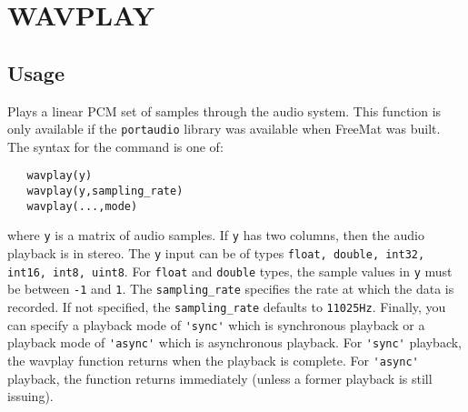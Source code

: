 \section{WAVPLAY}

\subsection{Usage}

Plays a linear PCM set of samples through the audio system.  This
function is only available if the \verb|portaudio| library was available
when FreeMat was built.  The syntax for the command is one of:
\begin{verbatim}
   wavplay(y)
   wavplay(y,sampling_rate)
   wavplay(...,mode)
\end{verbatim}
where \verb|y| is a matrix of audio samples.  If \verb|y| has two columns, then
the audio playback is in stereo.  The \verb|y| input can be of types 
\verb|float, double, int32, int16, int8, uint8|.  For \verb|float| and 
\verb|double| types, the sample values in \verb|y| must be between \verb|-1| and
\verb|1|.  The \verb|sampling_rate| specifies the rate at which the data is 
recorded.  If not specified, the \verb|sampling_rate| defaults to \verb|11025Hz|.
Finally, you can specify a playback mode of \verb|'sync'| which is synchronous
playback or a playback mode of \verb|'async'| which is asynchronous playback.
For \verb|'sync'| playback, the wavplay function returns when the playback is
complete.  For \verb|'async'| playback, the function returns immediately (unless
a former playback is still issuing).
